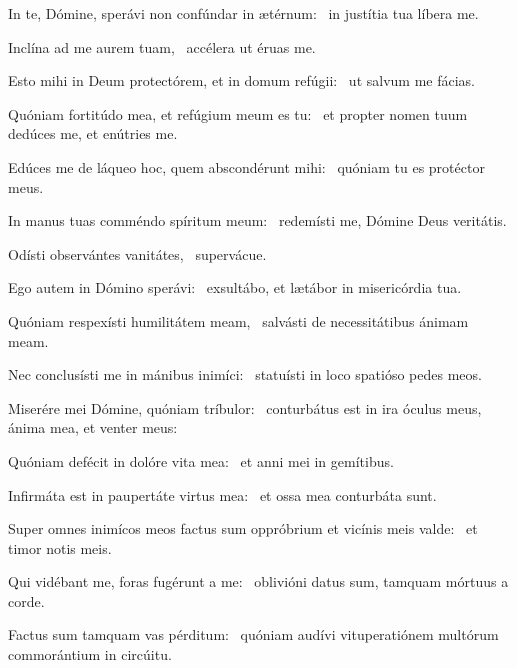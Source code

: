 \item In te, Dómine, sperávi non confúndar in ætérnum:~\psstar{} in justítia tua líbera me.

\item Inclína ad me aurem tuam,~\psstar{} accélera ut éruas me.

\item Esto mihi in Deum protectórem, et in domum refúgii:~\psstar{} ut salvum me fácias.

\item Quóniam fortitúdo mea, et refúgium meum es tu:~\psstar{} et propter nomen tuum dedúces me, et enútries me.

\item Edúces me de láqueo hoc, quem abscondérunt mihi:~\psstar{} quóniam tu es protéctor meus.

\item In manus tuas comméndo spíritum meum:~\psstar{} redemísti me, Dómine Deus veritátis.

\item Odísti observántes vanitátes,~\psstar{} supervácue.

\item Ego autem in Dómino sperávi:~\psstar{} exsultábo, et lætábor in misericórdia tua.

\item Quóniam respexísti humilitátem meam,~\psstar{} salvásti de necessitátibus ánimam meam.

\item Nec conclusísti me in mánibus inimíci:~\psstar{} statuísti in loco spatióso pedes meos.

\item Miserére mei Dómine, quóniam tríbulor:~\pscross{} conturbátus est in ira óculus meus,~\psstar{} ánima mea, et venter meus:

\item Quóniam defécit in dolóre vita mea:~\psstar{} et anni mei in gemítibus.

\item Infirmáta est in paupertáte virtus mea:~\psstar{} et ossa mea conturbáta sunt.

\item Super omnes inimícos meos factus sum oppróbrium et vicínis meis valde:~\psstar{} et timor notis meis.

\item Qui vidébant me, foras fugérunt a me:~\psstar{} oblivióni datus sum, tamquam mórtuus a corde.

\item Factus sum tamquam vas pérditum:~\psstar{} quóniam audívi vituperatiónem multórum commorántium in circúitu.

